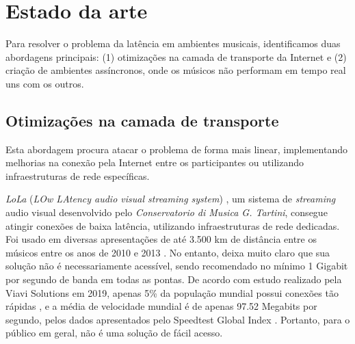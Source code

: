 \section{Estado da arte}


Para resolver o problema da latência em ambientes musicais, identificamos duas abordagens principais: (1) otimizações na camada de transporte da Internet e (2) criação de ambientes assíncronos, onde os músicos não performam em tempo real uns com os outros.

\subsection{Otimizações na camada de transporte}

Esta abordagem procura atacar o problema de forma mais linear, implementando melhorias na conexão pela Internet entre os participantes ou utilizando infraestruturas de rede específicas.

\textit{LoLa} (\textit{LOw LAtency audio visual streaming system}) \cite{lola}, um sistema de \textit{streaming} audio visual desenvolvido pelo \textit{Conservatorio di Musica G. Tartini}, consegue atingir conexões de baixa latência, utilizando infraestruturas de rede dedicadas. Foi usado em diversas apresentações de até 3.500 km de distância entre os músicos entre os anos de 2010 e 2013 \cite{lola_streaming}. No entanto, deixa muito claro que sua solução não é necessariamente acessível, sendo recomendado no mínimo 1 Gigabit por segundo de banda em todas as pontas. De acordo com estudo realizado pela Viavi Solutions em 2019, apenas 5\% da população mundial possui conexões tão rápidas \cite{1gbps}, e a média de velocidade mundial é de apenas 97.52 Megabits por segundo, pelos dados apresentados pelo Speedtest Global Index \cite{speed_test}. Portanto, para o público em geral, não é uma solução de fácil acesso.


